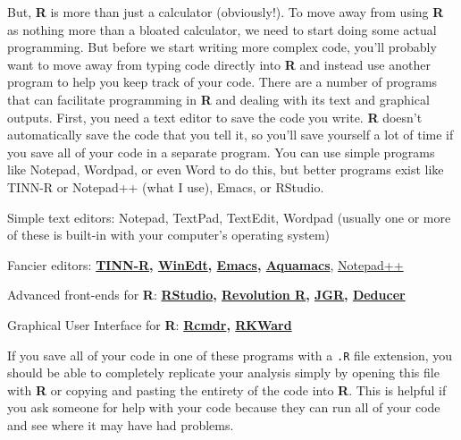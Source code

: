 \documentclass[12pt]{article}\usepackage[]{graphicx}\usepackage[]{color}
\begin{document}
But, \textbf{R} is more than just a calculator (obviously!). To move away from using \textbf{R} as nothing more than a bloated calculator, we need to start doing some actual programming. But before we start writing more complex code, you'll probably want to move away from typing code directly into \textbf{R} and instead use another program to help you keep track of your code. There are a number of programs that can facilitate programming in \textbf{R} and dealing with its text and graphical outputs. First, you need a text editor to save the code you write. \textbf{R} doesn't automatically save the code that you tell it, so you'll save yourself a lot of time if you save all of your code in a separate program. You can use simple programs like Notepad, Wordpad, or even Word to do this, but better programs exist like TINN-R or Notepad++ (what I use), Emacs, or RStudio.%
\begin{itemize*}
\item Simple text editors: Notepad, TextPad, TextEdit, Wordpad (usually one or more of these is built-in with your computer's operating system)
\item Fancier editors: \textbf{\href{http://sciviews.org/Tinn-R/}{TINN-R}, \href{http://www.winedt.com/}{WinEdt}, \href{http://www.gnu.org/software/emacs/}{Emacs}, \href{http://aquamacs.org/}{Aquamacs}}, \href{http://notepad-plus-plus.org/}{Notepad++}
\item Advanced front-ends for \textbf{R}: \textbf{\href{http://rstudio.org/}{RStudio}, \href{http://www.revolutionanalytics.com/products/revolution-enterprise.php}{Revolution R}, \href{http://rforge.net/JGR/}{JGR}, \href{http://www.deducer.org/pmwiki/pmwiki.php}{Deducer}}
\item Graphical User Interface for \textbf{R}: \textbf{\href{http://socserv.mcmaster.ca/jfox/Misc/Rcmdr/}{Rcmdr}, \href{http://rkward.sourceforge.net/}{RKWard}}
\end{itemize*}

If you save all of your code in one of these programs with a \verb|.R| file extension, you should be able to completely replicate your analysis simply by opening this file with \textbf{R} or copying and pasting the entirety of the code into \textbf{R}. This is helpful if you ask someone for help with your code because they can run all of your code and see where it may have had problems.
\end{document}
